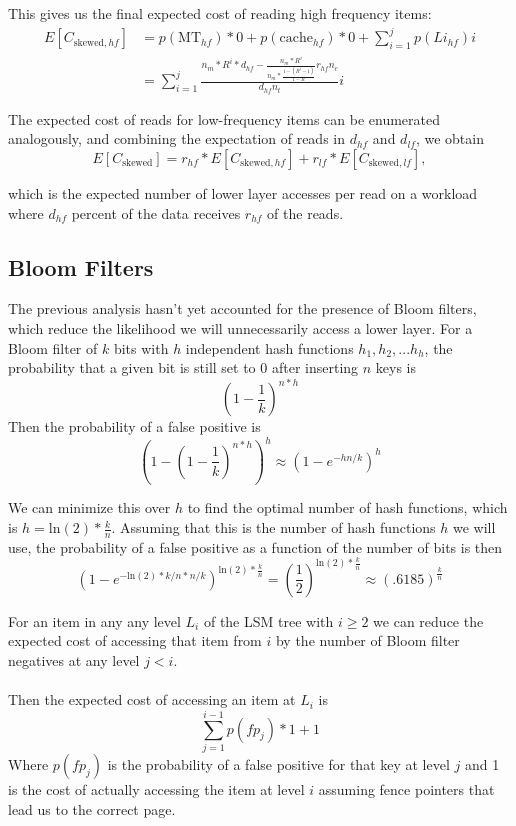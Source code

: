 \documentclass{sig-alternate-05-2015}
\begin{document}
This gives us the final expected cost of reading high frequency items:
$$
\begin{aligned}
E[C_{\text{skewed}, hf}]
& = p(\text{MT}_{hf}) * 0  + p(\text{cache}_{hf}) * 0 + \sum_{i=1}^j p(Li_{hf}) i \\
& = \sum_{i=1}^j \frac{n_m * R^{i}*d_{hf} - \frac{n_m * R^{i}}{n_m * \frac{1-(R^j-1)}{1-R}} r_{hf} n_c}{d_{hf} n_t} i
\end{aligned}
$$

The expected cost of reads for low-frequency items can be enumerated analogously, and combining the expectation of reads in $d_{hf}$ and $d_{lf}$, we obtain
$$
E[C_{\text{skewed}}] = r_{hf} * E[C_{\text{skewed}, hf}] + r_{lf} * E[C_{\text{skewed}, lf}],
$$

which is the expected number of lower layer accesses per read on a workload where $d_{hf}$ percent of the data receives $r_{hf}$ of the reads.

\subsection{Bloom Filters}

The previous analysis hasn't yet accounted for the presence of Bloom filters, which reduce the likelihood we will unnecessarily access a lower layer. For a Bloom filter of $k$ bits with $h$ independent hash functions $h_1, h_2,...h_h$, the probability that a given bit is still set to 0 after inserting $n$ keys is 
$$
(1 - \frac{1}{k})^{n*h}
$$
Then the probability of a false positive is 
$$
(1- (1 - \frac{1}{k})^{n*h})^h \approx (1 - e^{-hn/k})^h
$$

We can minimize this over $h$ to find the optimal number of hash functions, which is $h = \mathrm{ln}(2) * \frac{k}{n}$. Assuming that this is the number of hash functions $h$ we will use, the probability of a false positive as a function of the number of bits is then 
$$
(1 - e^{-\mathrm{ln}(2)*k/n*n/k})^{\mathrm{ln}(2) * \frac{k}{n}} = (\frac{1}{2}) ^ {\mathrm{ln}(2) * \frac{k}{n}} \approx (.6185) ^  {\frac{k}{n}}
$$

For an item in any any level $L_i$ of the LSM tree with $i \geq 2$ we can reduce the expected cost of accessing that item from $i$ by the number of Bloom filter negatives at any level $j<i$. \\ \\
Then the expected cost of accessing an item at $L_i$ is  $$\sum_{j=1}^{i-1} p(fp_j) * 1 + 1$$
Where $p(fp_j)$ is the probability of a false positive for that key at level $j$ and 1 is the cost of actually accessing the item at level $i$ assuming fence pointers that lead us to the correct page.
\end{document}

